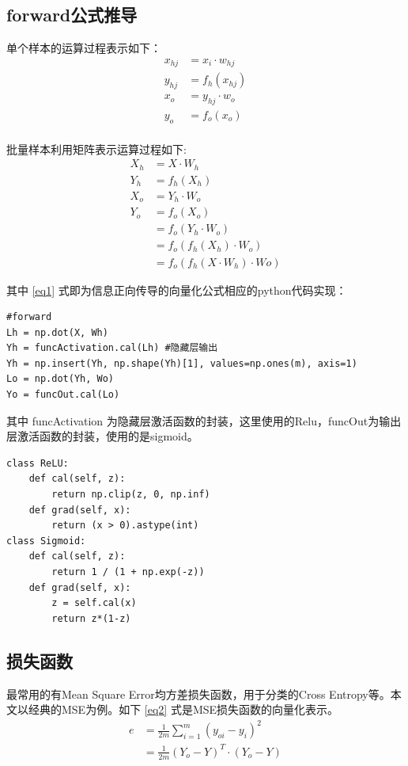 \documentclass[12pt, a4paper, oneside]{ctexart}
\begin{document}
\subsection{forward公式推导}
单个样本的运算过程表示如下：
\begin{align*}
    x_{hj} &= x_i \cdot w_{hj} 			\\
	y_{hj} &= f_h(x_{hj}) 				\\
	x_o &= y_{hj} \cdot w_{o} 			\\
	y_{o} &= f_o(x_o) 					\\
\end{align*}

批量样本利用矩阵表示运算过程如下:
\begin{align}
	X_h  &= X \cdot W_h 							\nonumber\\
	Y_h  &= f_h(X_h) 								\nonumber\\
	X_o  &= Y_h \cdot W_o 							\nonumber\\
    Y_o  &= f_o(X_o) 								\nonumber\\
    	 &= f_o(Y_h \cdot W_o) 					    \nonumber\\
    	 &= f_o(f_h(X_h) \cdot W_o) 				\nonumber\\
         &= f_o(f_h(X \cdot W_h) \cdot Wo)          \label{eq1}
\end{align}

其中 \eqref{eq1} 式即为信息正向传导的向量化公式相应的python代码实现：

\begin{lstlisting}
#forward
Lh = np.dot(X, Wh)
Yh = funcActivation.cal(Lh) #隐藏层输出
Yh = np.insert(Yh, np.shape(Yh)[1], values=np.ones(m), axis=1)
Lo = np.dot(Yh, Wo)
Yo = funcOut.cal(Lo)
\end{lstlisting}

其中 funcActivation 为隐藏层激活函数的封装，这里使用的Relu，funcOut为输出层激活函数的封装，使用的是sigmoid。
\begin{lstlisting}
class ReLU:
    def cal(self, z):
        return np.clip(z, 0, np.inf)
    def grad(self, x):
        return (x > 0).astype(int)
class Sigmoid:
    def cal(self, z):
        return 1 / (1 + np.exp(-z))
    def grad(self, x):
        z = self.cal(x)
        return z*(1-z)
\end{lstlisting}

\subsection{损失函数}
最常用的有Mean Square Error均方差损失函数，用于分类的Cross Entropy等。本文以经典的MSE为例。如下 \eqref{eq2} 式是MSE损失函数的向量化表示。
\begin{align}
	e 	&= \frac{1}{2m}\sum_{i=1}^{m} (y_{oi} - y_i)^2 				\nonumber\\
		&= \frac{1}{2m}(Y_o - Y)^T \cdot (Y_o - Y)                  \label{eq2}	
\end{align}
\end{document}
